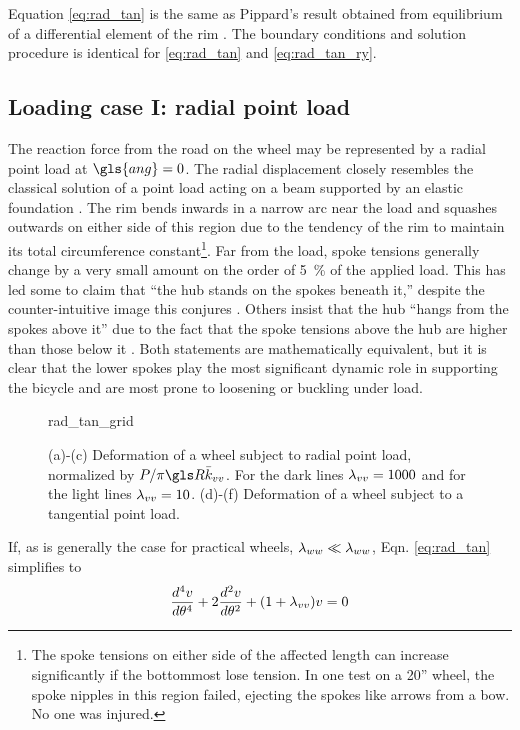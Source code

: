 \documentclass[\rootdir/thesis.tex]{subfiles}
\begin{document}
Equation \eqref{eq:rad_tan} is the same as Pippard’s result obtained from equilibrium of a differential element of the rim \cite{Pippard1932b}. The boundary conditions and solution procedure is identical for \eqref{eq:rad_tan} and \eqref{eq:rad_tan_ry}.

\subsection{Loading case I: radial point load}

The reaction force from the road on the wheel may be represented by a radial point load at $\gls{ang}=0$. The radial displacement closely resembles the classical solution of a point load acting on a beam supported by an elastic foundation \cite{Hetenyi1946}. The rim bends inwards in a narrow arc near the load and squashes outwards on either side of this region due to the tendency of the rim to maintain its total circumference constant\footnote{The spoke tensions on either side of the affected length can increase significantly if the bottommost lose tension. In one test on a 20'' wheel, the spoke nipples in this region failed, ejecting the spokes like arrows from a bow. No one was injured.}. Far from the load, spoke tensions generally change by a very small amount on the order of \SI{5}{\percent} of the applied load. This has led some to claim that ``the hub stands on the spokes beneath it,'' despite the counter-intuitive image this conjures \cite{Brandt1993,Forester1980}. Others insist that the hub ``hangs from the spokes above it'' due to the fact that the spoke tensions above the hub are higher than those below it \cite{Fine1998}. Both statements are mathematically equivalent, but it is clear that the lower spokes play the most significant dynamic role in supporting the bicycle and are most prone to loosening or buckling under load.

\begin{figure}
\centering
{rad_tan_grid}
\caption{(a)-(c) Deformation of a wheel subject to radial point load, normalized by $P/\pi\R\kvv$. For the dark lines $\lambda_{vv}=1000$ and for the light lines $\lambda_{vv}=10$. (d)-(f) Deformation of a wheel subject to a tangential point load.}
\label{fig:rad_tan_grid}
\end{figure}

If, as is generally the case for practical wheels, $\lambda_{ww} \ll \lambda_{ww}$, Eqn. \eqref{eq:rad_tan} simplifies to
\begin{equation}
\label{eq:rad}
\frac{d^4v}{d\theta^4} + 2\frac{d^2v}{d\theta^2} + (1+\lambda_{vv})v=0
\end{equation}
\end{document}
